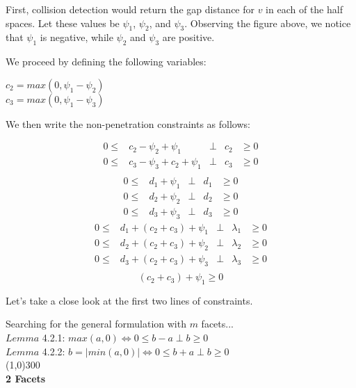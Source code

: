 \documentclass{article}
\begin{document}
First, collision detection would return the gap distance for $v$ in each of the half spaces.  Let these values be $\psi_1$, $\psi_2$, and $\psi_3$.  Observing the figure above, we notice that $\psi_1$ is negative, while $\psi_2$ and $\psi_3$ are positive.   

We proceed by defining the following variables: 
\begin{center}
$c_2 = max(0, \psi_1 - \psi_2)  $ \\
$c_3 = max(0, \psi_1 - \psi_3)  $ 
\end{center}
We then write the non-penetration constraints as follows: 

\[ 
\begin{matrix}
0 \leq & c_2 - \psi_2 + \psi_1 & \perp & c_2 & \geq 0 \\
0 \leq & c_3 - \psi_3 + c_2 + \psi_1 & \perp & c_3 & \geq 0 \\
\end{matrix}
\]
\[
\begin{matrix}  
0 \leq & d_1 + \psi_1 & \perp & d_1 & \geq 0 \\
0 \leq & d_2 + \psi_2 & \perp & d_2 & \geq 0 \\
0 \leq & d_3 + \psi_3 & \perp & d_3 & \geq 0 
\end{matrix} 
\]
\[
\begin{matrix}  
0 \leq & d_1 + (c_2 + c_3) + \psi_1 & \perp & \lambda_1 & \geq 0 \\
0 \leq & d_2 + (c_2 + c_3) + \psi_2 & \perp & \lambda_2 & \geq 0 \\
0 \leq & d_3 + (c_2 + c_3) + \psi_3 & \perp & \lambda_3 & \geq 0 \\
\end{matrix} 
\]
\[
(c_2 + c_3) + \psi_1 \geq 0
\]

Let's take a close look at the first two lines of constraints.  

\newpage
Searching for the general formulation with $m$ facets...  \\
$Lemma$ 4.2.1: $max(a,0) \iff 0 \leq b-a \perp b \geq 0$ \\
$Lemma$ 4.2.2: $b = |min(a,0)| \iff 0 \leq b + a \perp b \geq 0$ \\
\line(1,0){300} \\  \textbf{2 Facets} 
\end{document}
